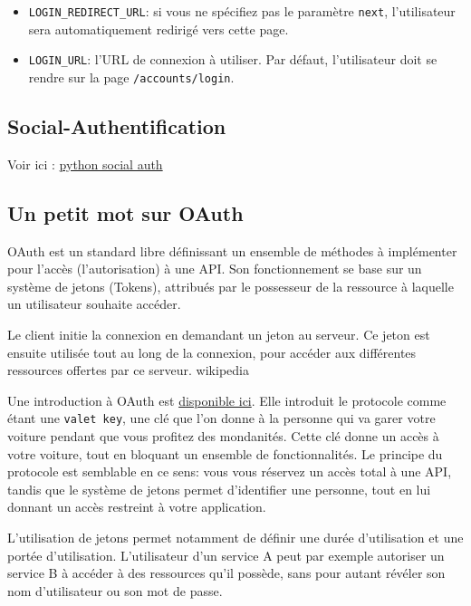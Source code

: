 \documentclass[11pt]{amsbook}
\begin{document}
\begin{itemize}

\item \texttt{LOGIN\_REDIRECT\_URL}: si vous ne spécifiez pas le paramètre \texttt{next}, l’utilisateur sera automatiquement redirigé vers cette page.

\item \texttt{LOGIN\_URL}: l’URL de connexion à utiliser. Par défaut, l’utilisateur doit se rendre sur la page \texttt{/accounts/login}.

\end{itemize}


\hypertarget{x-social-authentification}{\subsection{Social-Authentification}}
Voir ici : \href{https://github.com/omab/python-social-auth}{python social auth}


\hypertarget{x-un-petit-mot-sur-oauth}{\subsection{Un petit mot sur OAuth}}
OAuth est un standard libre définissant un ensemble de méthodes à implémenter pour l’accès (l’autorisation) à une API. Son fonctionnement se base sur un système de jetons (Tokens), attribués par le possesseur de la ressource à laquelle un utilisateur souhaite accéder.


Le client initie la connexion en demandant un jeton au serveur. Ce jeton est ensuite utilisée tout au long de la connexion, pour accéder aux différentes ressources offertes par ce serveur. wikipedia

Une introduction à OAuth est \href{http://hueniverse.com/oauth/guide/intro/}{disponible ici}. Elle introduit le protocole comme étant une \texttt{valet key}, une clé que l’on donne à la personne qui va garer votre voiture pendant que vous profitez des mondanités. Cette clé donne un accès à votre voiture, tout en bloquant un ensemble de fonctionnalités. Le principe du protocole est semblable en ce sens: vous vous réservez un accès total à une API, tandis que le système de jetons permet d’identifier une personne, tout en lui donnant un accès restreint à votre application.


L’utilisation de jetons permet notamment de définir une durée d’utilisation et une portée d’utilisation. L’utilisateur d’un service A peut par exemple autoriser un service B à accéder à des ressources qu’il possède, sans pour autant révéler son nom d’utilisateur ou son mot de passe.
\end{document}
